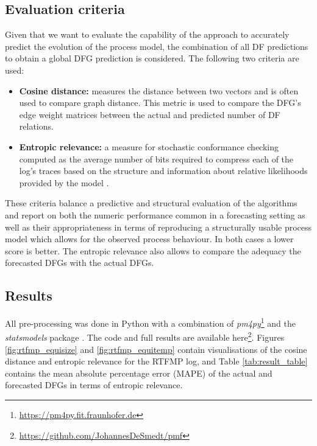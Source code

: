 \subsection{Evaluation criteria}
Given that we want to evaluate the capability of the approach to accurately predict the evolution of the process model, the combination of all DF predictions to obtain a global DFG prediction is considered.
The following two criteria are used:
\begin{itemize}
	\item \textbf{Cosine distance:} measures the distance between two vectors and is often used to compare graph distance. This metric is used to compare the DFG's edge weight matrices between the actual and predicted number of DF relations.
	\item \textbf{Entropic relevance:} a measure for stochastic conformance checking computed as the average number of bits required to compress each of the log’s traces based on the structure and information about relative likelihoods provided by the model \cite{DBLP:conf/icpm/PolyvyanyyMG20}.
\end{itemize}
These criteria balance a predictive and structural evaluation of the algorithms and report on both the numeric performance common in a forecasting setting as well as their appropriateness in terms of reproducing a structurally usable process model which allows for the observed process behaviour.
In both cases a lower score is better.
The entropic relevance also allows to compare the adequacy the forecasted DFGs with the actual DFGs.

\subsection{Results}
All pre-processing was done in Python with a combination of \emph{pm4py}\footnote{\url{https://pm4py.fit.fraunhofer.de}} and the \emph{statsmodels} package \cite{seabold2010statsmodels}. 
The code and full results are available here\footnote{\url{https://github.com/JohannesDeSmedt/pmf}}.
Figures \ref{fig:rtfmp_equisize} and \ref{fig:rtfmp_equitemp} contain visualisations of the cosine distance and entropic relevance for the RTFMP log, and Table \ref{tab:result_table} contains the mean absolute percentage error (MAPE) of the actual and forecasted DFGs in terms of entropic relevance.


